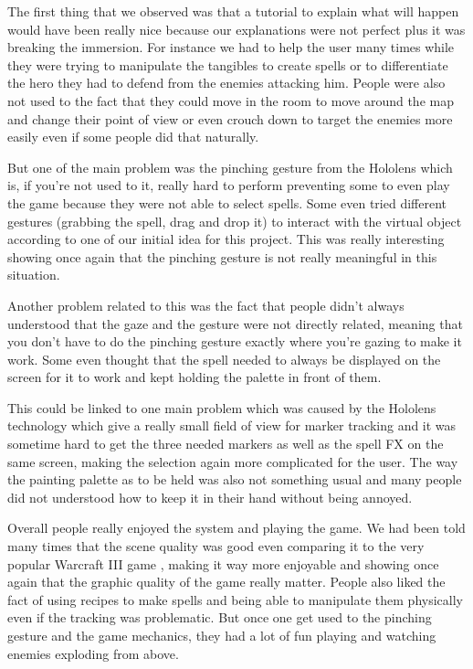 \documentclass[sigchi, authorversion, screen]{acmart}
\begin{document}
The first thing that we observed was that a tutorial to explain what will happen would have been really nice because our explanations were not perfect plus it was breaking the immersion. For instance we had to help the user many times while they were trying to manipulate the tangibles to create spells or to differentiate the hero they had to defend from the enemies attacking him. People were also not used to the fact that they could move in the room to move around the map and change their point of view or even crouch down to target the enemies more easily even if some people did that naturally. 

But one of the main problem was the pinching gesture from the Hololens which is, if you’re not used to it, really hard to perform preventing some to even play the game because they were not able to select spells. Some even tried different gestures (grabbing the spell, drag and drop it) to interact with the virtual object according to one of our initial idea for this project. This was really interesting showing once again that the pinching gesture is not really meaningful in this situation.

Another problem related to this was the fact that people didn’t always understood that the gaze and the gesture were not directly related, meaning that you don’t have to do the pinching gesture exactly where you’re gazing to make it work. Some even thought that the spell needed to always be displayed on the screen for it to work and kept holding the palette in front of them.

This could be linked to one main problem which was caused by the Hololens technology which give a really small field of view for marker tracking and it was sometime hard to get the three needed markers as well as the spell FX on the same screen, making the selection again more complicated for the user.
The way the painting palette as to be held was also not something usual and many people did not understood how to keep it in their hand without being annoyed. 

Overall people really enjoyed the system and playing the game. We had been told many times that the scene quality was good even comparing it to the very popular Warcraft III game \cite{warcraft}, making it way more enjoyable and showing once again that the graphic quality of the game really matter. People also liked the fact of using recipes to make spells and being able to manipulate them physically even if the tracking was problematic. But once one get used to the pinching gesture and the game mechanics, they had a lot of fun playing and watching enemies exploding from above.
\end{document}
